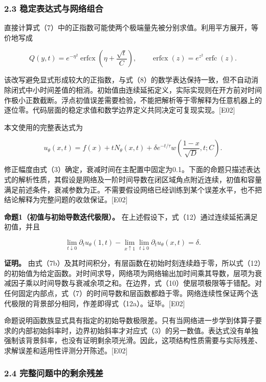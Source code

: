 \documentclass[11pt,a4paper]{article}
\begin{document}
\subsubsection{2.3 稳定表达式与网络组合}\label{ux7a33ux5b9aux8868ux8fbeux5f0fux4e0eux7f51ux7edcux7ec4ux5408}

直接计算式（7）中的正指数可能使两个极端量先被分别求值。利用平方展开，等价地写成

\[
Q(y,t)=e^{-\eta^2}\operatorname{erfcx}\!\left(\eta+\frac{\sqrt t}{C}\right),
\qquad \operatorname{erfcx}(z)=e^{z^2}\operatorname{erfc}(z).
\tag{11}
\]

该改写避免显式形成较大的正指数，与式（8）的数学表达保持一致，但不自动消除闭式中小时间差值的相消。初始值由连续延拓定义，实际实现则在开方前对时间作极小正数截断。浮点初值误差需要检验，不能把解析等于零解释为任意机器上的逐位零。代码层面的稳定求值和数学边界定义共同决定可复现实现。{[}E02{]}

本文使用的完整表达式为

\[
u_\theta(x,t)=f(x)+tN_\theta(x,t)
+\delta e^{-t/\tau}w\!\left(\frac{1-x}{\sqrt D},t;C\right).
\tag{12}
\]

修正幅度由式（3）确定，衰减时间在主配置中固定为0.1。下面的命题只描述表达式的解析性质，其假设是网络及一阶时间导数在闭区域角点附近连续，初值和容量满足前述条件，衰减参数为正。不需要假设网络已经训练到某个误差水平，也不把结论解释为完整问题的收敛保证。{[}E02{]}

\textbf{命题1（初值与初始导数迭代极限）。} 在上述假设下，式（12）通过连续延拓满足初值，并且

\[
\lim_{t\downarrow0}\partial_tu_\theta(1,t)
-\lim_{x\uparrow1}\lim_{t\downarrow0}\partial_tu_\theta(x,t)=\delta.
\tag{12a}
\]

\textbf{证明。} 由式（7b）及其时间积分，有层函数在初始时刻连续趋于零，所以式（12）的初始值为给定函数。对时间求导，网络项为网络输出加时间乘其导数，层项为衰减因子乘以时间导数与衰减余项之和。在边界，式（10）使层项极限等于错配。对任何固定内部点，式（7）的时间导数和层函数都趋于零。网络连续性保证两个迭代极限的背景部分相同，作差即得式（12a）。证毕。{[}E02{]}

命题说明函数族显式具有指定的初始导数极限差。只有当网络进一步学到体算子要求的内部初始斜率时，边界初始斜率才对应式（3）的另一数值。表达式没有单独强制该背景斜率，也没有证明剩余项光滑。因此，这项结构性质需要与实际残差、求解误差和适用性评测分开陈述。{[}E02{]}

\subsubsection{2.4 完整问题中的剩余残差}\label{ux5b8cux6574ux95eeux9898ux4e2dux7684ux5269ux4f59ux6b8bux5dee}
\end{document}
